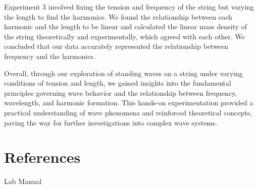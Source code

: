 \documentclass[11pt]{article}
\let\oldsection\section
\renewcommand\section{\clearpage\oldsection}
\begin{document}
    Experiment 3 involved fixing the tension and frequency of the string but varying the length to find the harmonics. We found the relationship between each harmonic and the length to be linear and calculated the linear mass density of the string theoretically and experimentally, which agreed with each other. We concluded that our data accurately represented the relationship between frequency and the harmonics.

    Overall, through our exploration of standing waves on a string under varying conditions of tension and length, we gained insights into the fundamental principles governing wave behavior and the relationship between frequency, wavelength, and harmonic formation. This hands-on experimentation provided a practical understanding of wave phenomena and reinforced theoretical concepts, paving the way for further investigations into complex wave systems.
    
    \appendix
    \section{References}\label{sec:references}

    Lab Manual
\end{document}
